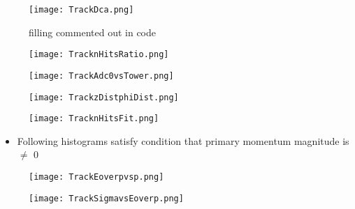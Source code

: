 \documentclass{beamer}
\begin{document}
\begin{frame}
  \begin{figure}[h!]
  \centering
  \texttt{[image: TrackDca.png]}
  \caption{filling commented out in code}
  \end{figure}
\end{frame}

\begin{frame}
  \begin{figure}[h!]
  \centering
  \texttt{[image: TracknHitsRatio.png]}
  \end{figure}
\end{frame}

\begin{frame}
  \begin{figure}[h!]
  \centering
  \texttt{[image: TrackAdc0vsTower.png]}
  \end{figure}
\end{frame}

\begin{frame}
  \begin{figure}[h!]
  \centering
  \texttt{[image: TrackzDistphiDist.png]}
  \end{figure}
\end{frame}

\begin{frame}
	\begin{figure}[h!]
		\centering
		\texttt{[image: TracknHitsFit.png]}
	\end{figure}
\end{frame}

\begin{frame}
	\begin{itemize}
		\item Following histograms satisfy condition that primary momentum magnitude is $\neq$ 0 
	\end{itemize}
\end{frame}

\begin{frame}
	\begin{figure}[h!]
		\centering
		\texttt{[image: TrackEoverpvsp.png]}
	\end{figure}
\end{frame}

\begin{frame}
	\begin{figure}[h!]
		\centering
		\texttt{[image: TrackSigmavsEoverp.png]}
	\end{figure}
\end{frame}
\end{document}
